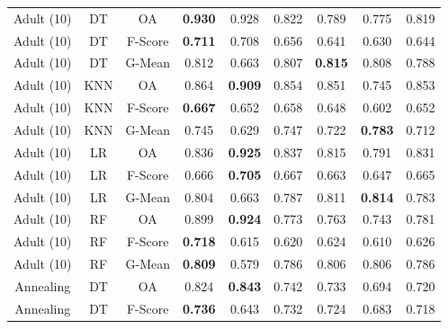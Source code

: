 \begin{longtable}{ccccccccc}
        Adult (10) &         DT &      OA & \textbf{0.930} &          0.928 &          0.822 &          0.789 &          0.775 &          0.819 \\
        Adult (10) &         DT & F-Score & \textbf{0.711} &          0.708 &          0.656 &          0.641 &          0.630 &          0.644 \\
        Adult (10) &         DT &  G-Mean &          0.812 &          0.663 &          0.807 & \textbf{0.815} &          0.808 &          0.788 \\
        Adult (10) &        KNN &      OA &          0.864 & \textbf{0.909} &          0.854 &          0.851 &          0.745 &          0.853 \\
        Adult (10) &        KNN & F-Score & \textbf{0.667} &          0.652 &          0.658 &          0.648 &          0.602 &          0.652 \\
        Adult (10) &        KNN &  G-Mean &          0.745 &          0.629 &          0.747 &          0.722 & \textbf{0.783} &          0.712 \\
        Adult (10) &         LR &      OA &          0.836 & \textbf{0.925} &          0.837 &          0.815 &          0.791 &          0.831 \\
        Adult (10) &         LR & F-Score &          0.666 & \textbf{0.705} &          0.667 &          0.663 &          0.647 &          0.665 \\
        Adult (10) &         LR &  G-Mean &          0.804 &          0.663 &          0.787 &          0.811 & \textbf{0.814} &          0.783 \\
        Adult (10) &         RF &      OA &          0.899 & \textbf{0.924} &          0.773 &          0.763 &          0.743 &          0.781 \\
        Adult (10) &         RF & F-Score & \textbf{0.718} &          0.615 &          0.620 &          0.624 &          0.610 &          0.626 \\
        Adult (10) &         RF &  G-Mean & \textbf{0.809} &          0.579 &          0.786 &          0.806 &          0.806 &          0.786 \\
         Annealing &         DT &      OA &          0.824 & \textbf{0.843} &          0.742 &          0.733 &          0.694 &          0.720 \\
         Annealing &         DT & F-Score & \textbf{0.736} &          0.643 &          0.732 &          0.724 &          0.683 &          0.718 \\

\end{longtable}
